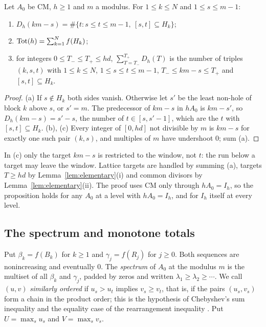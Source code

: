 \begin{proposition}\label{prop:counting}
Let $A_0$ be CM, $h\ge1$ and $m$ a modulus. For $1\le k\le N$ and $1\le s\le m-1$:
\begin{enumerate}
\item[(a)] $D_h(km-s)=\#\{t: s\le t\le m-1,\ [s,t]\subseteq H_k\}$;
\item[(b)] $\operatorname{Tot}(h)=\sum_{k=1}^{N}f(H_k)$;
\item[(c)] for integers $0\le T_-\le T_+\le hd$, $\sum_{T=T_-}^{T_+}D_h(T)$ is the number of triples $(k,s,t)$ with $1\le k\le N$, $1\le s\le t\le m-1$, $T_-\le km-s\le T_+$ and $[s,t]\subseteq H_k$.
\end{enumerate}
\end{proposition}

\begin{proof}
(a) If $s\notin H_k$ both sides vanish. Otherwise let $s'$ be the least non-hole of block $k$ above $s$, or $s'=m$. The predecessor of $km-s$ in $hA_0$ is $km-s'$, so $D_h(km-s)=s'-s$, the number of $t\in[s,s'-1]$, which are the $t$ with $[s,t]\subseteq H_k$. (b), (c) Every integer of $[0,hd]$ not divisible by $m$ is $km-s$ for exactly one such pair $(k,s)$, and multiples of $m$ have undershoot $0$; sum (a).
\end{proof}

In (c) only the target $km-s$ is restricted to the window, not $t$: the run below a target may leave the window. Lattice targets are handled by summing (a), targets $T\ge hd$ by Lemma~\ref{lem:elementary}(i) and common divisors by Lemma~\ref{lem:elementary}(ii). The proof uses CM only through $hA_0=I_h$, so the proposition holds for any $A_0$ at a level with $hA_0=I_h$, and for $I_h$ itself at every level.

\subsection{The spectrum and monotone totals}\label{subsec:spectrum}

Put $\beta_k=f(B_k)$ for $k\ge1$ and $\gamma_j=f(R_j)$ for $j\ge0$. Both sequences are nonincreasing and eventually $0$. The \emph{spectrum} of $A_0$ at the modulus $m$ is the multiset of all $\beta_k$ and $\gamma_j$, padded by zeros and written $\lambda_1\ge\lambda_2\ge\cdots$. We call $(u,v)$ \emph{similarly ordered} if $u_s>u_t$ implies $v_s\ge v_t$, that is, if the pairs $(u_s,v_s)$ form a chain in the product order; this is the hypothesis of Chebyshev's sum inequality and the equality case of the rearrangement inequality \cite[Thms.~43, 368 and 369]{HardyLittlewoodPolya1952}. Put $U=\max_su_s$ and $V=\max_sv_s$.

